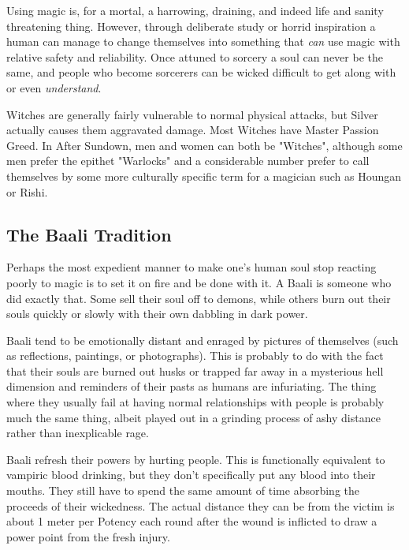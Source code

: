 Using magic is, for a mortal, a harrowing, draining, and indeed life and sanity threatening thing. However, through deliberate study or horrid inspiration a human can manage to change themselves into something that \textit{can} use magic with relative safety and reliability. Once attuned to sorcery a soul can never be the same, and people who become sorcerers can be wicked difficult to get along with or even \textit{understand}.

Witches are generally fairly vulnerable to normal physical attacks, but Silver actually causes them aggravated damage. Most Witches have Master Passion Greed. In After Sundown, men and women can both be "Witches", although some men prefer the epithet "Warlocks" and a considerable number prefer to call themselves by some more culturally specific term for a magician such as Houngan or Rishi.

\subsection[Baali]{The Baali Tradition} 

Perhaps the most expedient manner to make one's human soul stop reacting poorly to magic is to set it on fire and be done with it. A Baali is someone who did exactly that. Some sell their soul off to demons, while others burn out their souls quickly or slowly with their own dabbling in dark power.

Baali tend to be emotionally distant and enraged by pictures of themselves (such as reflections, paintings, or photographs). This is probably to do with the fact that their souls are burned out husks or trapped far away in a mysterious hell dimension and reminders of their pasts as humans are infuriating. The thing where they usually fail at having normal relationships with people is probably much the same thing, albeit played out in a grinding process of ashy distance rather than inexplicable rage. 

Baali refresh their powers by hurting people. This is functionally equivalent to vampiric blood drinking, but they don't specifically put any blood into their mouths. They still have to spend the same amount of time absorbing the proceeds of their wickedness. The actual distance they can be from the victim is about 1 meter per Potency each round after the wound is inflicted to draw a power point from the fresh injury.

